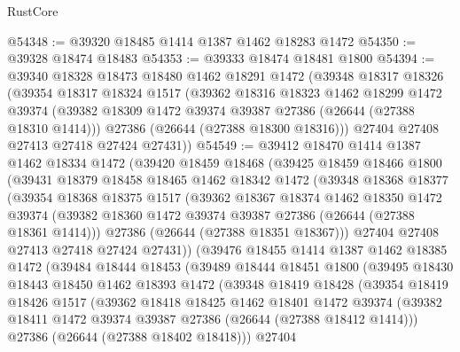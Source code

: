 \begin{lexlean}{RustCore}
\begin{coremodule}
@54348 := @39320 @18485 @1414 @1387 @1462 @18283 @1472
@54350 := @39328 @18474 @18483
@54353 := @39333 @18474 @18481 @1800
@54394 := @39340
    @18328
    @18473
    @18480
    @1462
    @18291
    @1472
    (@39348
      @18317
      @18326
      (@39354
        @18317
        @18324
        @1517
        (@39362
          @18316
          @18323
          @1462
          @18299
          @1472
          @39374
          (@39382 @18309 @1472 @39374 @39387 @27386 (@26644 (@27388 @18310 @1414)))
          @27386
          (@26644 (@27388 @18300 @18316)))
        @27404
        @27408
        @27413
        @27418
        @27424
        @27431))
@54549 := @39412
    @18470
    @1414
    @1387
    @1462
    @18334
    @1472
    (@39420
      @18459
      @18468
      (@39425
        @18459
        @18466
        @1800
        (@39431
          @18379
          @18458
          @18465
          @1462
          @18342
          @1472
          (@39348
            @18368
            @18377
            (@39354
              @18368
              @18375
              @1517
              (@39362
                @18367
                @18374
                @1462
                @18350
                @1472
                @39374
                (@39382 @18360 @1472 @39374 @39387 @27386 (@26644 (@27388 @18361 @1414)))
                @27386
                (@26644 (@27388 @18351 @18367)))
              @27404
              @27408
              @27413
              @27418
              @27424
              @27431))
          (@39476
            @18455
            @1414
            @1387
            @1462
            @18385
            @1472
            (@39484
              @18444
              @18453
              (@39489
                @18444
                @18451
                @1800
                (@39495
                  @18430
                  @18443
                  @18450
                  @1462
                  @18393
                  @1472
                  (@39348
                    @18419
                    @18428
                    (@39354
                      @18419
                      @18426
                      @1517
                      (@39362
                        @18418
                        @18425
                        @1462
                        @18401
                        @1472
                        @39374
                        (@39382 @18411 @1472 @39374 @39387 @27386 (@26644 (@27388 @18412 @1414)))
                        @27386
                        (@26644 (@27388 @18402 @18418)))
                      @27404

\end{coremodule}
\end{lexlean}
